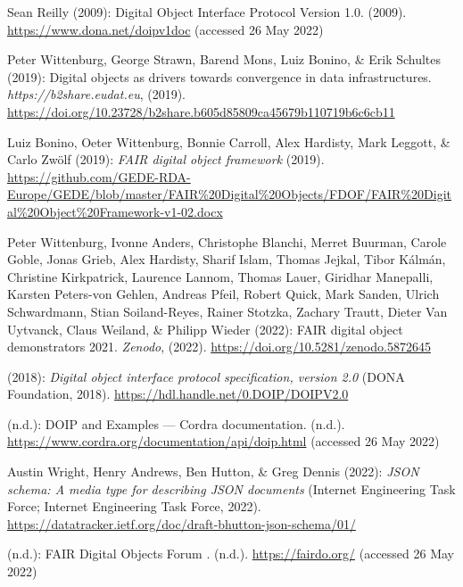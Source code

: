 \begin{thebibliography}{9}
Sean Reilly (2009): Digital {Object Interface Protocol Version} 1.0.
(2009). \url{https://www.dona.net/doipv1doc} (accessed 26 May 2022)

Peter Wittenburg, George Strawn, Barend Mons, Luiz Bonino, \& Erik
Schultes (2019): Digital objects as drivers towards convergence in data
infrastructures. \emph{https://b2share.eudat.eu}, (2019).
\url{https://doi.org/10.23728/b2share.b605d85809ca45679b110719b6c6cb11}

Luiz Bonino, Oeter Wittenburg, Bonnie Carroll, Alex Hardisty, Mark
Leggott, \& Carlo Zwölf (2019): \emph{{FAIR} digital object framework}
(2019).
\url{https://github.com/GEDE-RDA-Europe/GEDE/blob/master/FAIR\%20Digital\%20Objects/FDOF/FAIR\%20Digital\%20Object\%20Framework-v1-02.docx}

Peter Wittenburg, Ivonne Anders, Christophe Blanchi, Merret Buurman,
Carole Goble, Jonas Grieb, Alex Hardisty, Sharif Islam, Thomas Jejkal,
Tibor Kálmán, Christine Kirkpatrick, Laurence Lannom, Thomas Lauer,
Giridhar Manepalli, Karsten Peters-von Gehlen, Andreas Pfeil, Robert
Quick, Mark Sanden, Ulrich Schwardmann, Stian Soiland-Reyes, Rainer
Stotzka, Zachary Trautt, Dieter Van Uytvanck, Claus Weiland, \& Philipp
Wieder (2022): {FAIR} digital object demonstrators 2021. \emph{Zenodo},
(2022).
\url{https://doi.org/10.5281/zenodo.5872645}

(2018): \emph{Digital object interface protocol specification, version
2.0} ({DONA Foundation}, 2018).
\url{https://hdl.handle.net/0.DOIP/DOIPV2.0}

(n.d.): {DOIP} and {Examples} --- {Cordra} documentation. (n.d.).
\url{https://www.cordra.org/documentation/api/doip.html} (accessed 26
May 2022)

Austin Wright, Henry Andrews, Ben Hutton, \& Greg Dennis (2022):
\emph{JSON schema: A media type for describing JSON documents} (Internet
Engineering Task Force; Internet Engineering Task Force, 2022).
\url{https://datatracker.ietf.org/doc/draft-bhutton-json-schema/01/}

(n.d.): {FAIR Digital Objects Forum} \textbar. (n.d.).
\url{https://fairdo.org/} (accessed 26 May 2022)


\end{thebibliography}
